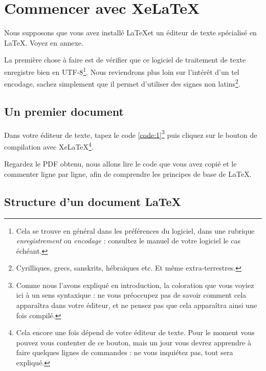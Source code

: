 \chapter{Commencer avec Xe\LaTeX\label{commencer}}

\begin{prealable}
Nous supposons que vous avez installé \LaTeX et un éditeur de texte spécialisé en \LaTeX. Voyez en annexe.

La première chose à faire est de vérifier que ce logiciel de traitement de texte enregistre bien en UTF-8\footnote{Cela se trouve en général dans les préférences du logiciel, dans une rubrique \emph{enregistrement} ou \emph{encodage} : consultez le manuel de votre logiciel le cas échéant.}. Nous reviendrons plus loin sur l'intérêt d'un tel encodage, sachez simplement que il permet d'utiliser des signes non latins\footnote{Cyrilliques, grecs, sanskrits, hébraïques etc. Et même extra-terrestres.}.

\end{prealable}

\section{Un premier document}

Dans votre éditeur de texte, tapez le code \ref{code:1}\footnote{Comme nous l'avons expliqué en introduction, la coloration que vous voyiez ici à un sens syntaxique : ne vous préoccupez pas de savoir comment cela apparaîtra dans votre éditeur, et ne pensez pas que cela apparaîtra ainsi une fois compilé.} puis cliquez sur le bouton de compilation avec Xe\LaTeX \footnote{Cela encore une fois dépend de votre éditeur de texte. Pour le moment vous pouvez vous contenter de ce bouton, mais un jour vous devrez apprendre à faire quelques lignes de commandes : ne vous inquiétez pas, tout sera expliqué.}.


Regardez le PDF obtenu, nous allons lire le code que vous avez copié et le commenter ligne par ligne, afin de comprendre les principes de base de \LaTeX.
\FloatBarrier

\section{Structure d'un document \LaTeX}

